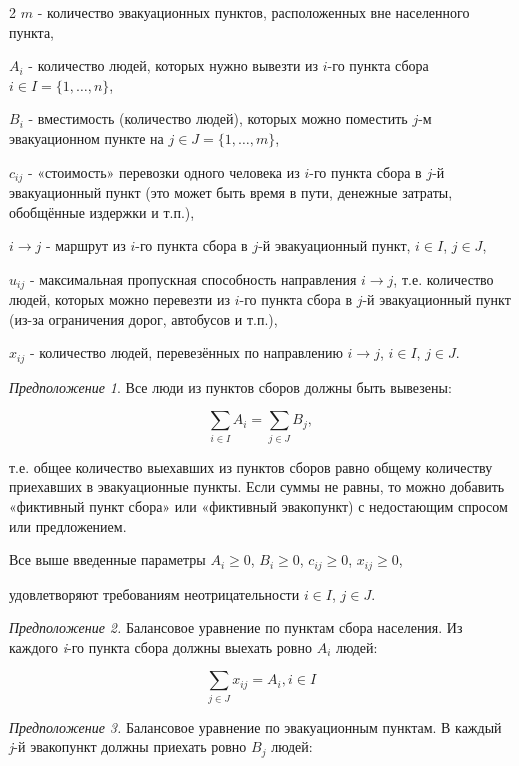 \begin{multicols}{2}
\(m\) - количество эвакуационных пунктов, расположенных вне
населенного пункта,

\(A_i\) - количество людей, которых нужно вывезти из \(i\)-го пункта сбора
\(i \in I = \{1, \dots, n\}\),

\(B_i\) - вместимость (количество людей), которых можно поместить \(j\)-м
эвакуационном пункте на \(j \in J = \{1, \dots, m\}\),

\(c_{ij}\) - «стоимость» перевозки одного человека из \(i\)-го пункта сбора в
\(j\)-й эвакуационный пункт (это может быть время в пути, денежные
затраты, обобщённые издержки и т.п.),

\(i \rightarrow j\) - маршрут из \(i\)-го пункта сбора в \(j\)-й эвакуационный пункт,
\(i \in I\), \(j \in J\),

\(u_{ij}\) - максимальная пропускная способность направления \(i \rightarrow j\),
т.е. количество людей, которых можно перевезти из \(i\)-го пункта
сбора в \(j\)-й эвакуационный пункт (из-за ограничения дорог,
автобусов и т.п.),

\(x_{ij}\) - количество людей, перевезённых по направлению
\(i \rightarrow j\), \(i \in I\), \(j \in J\).

\emph{Предположение 1}. Все люди из пунктов сборов должны быть вывезены:

\begin{equation}
\sum_{i \in I} A_{i} = \sum_{j \in J} B_{j},
\end{equation}

т.е. общее количество выехавших из пунктов сборов равно общему
количеству приехавших в эвакуационные пункты. Если суммы не равны, то
можно добавить «фиктивный пункт сбора» или «фиктивный эвакопункт) с
недостающим спросом или предложением.

Все выше введенные параметры
\(A_i\geq0\),
\(B_i\geq0\),
\(c_{ij}\geq0\),
\(x_{ij}\geq0\),

удовлетворяют требованиям неотрицательности \(i \in I\), \(j \in J\).

\emph{Предположение 2.} Балансовое уравнение по пунктам сбора населения.
Из каждого \emph{i}-го пункта сбора должны выехать ровно \(A_i\) людей:

\begin{equation}
\sum_{j \in J} x_{ij} = A_{i}, i \in I
\end{equation}

\emph{Предположение 3.} Балансовое уравнение по эвакуационным пунктам. В
каждый \emph{j}-й эвакопункт должны приехать ровно \(B_j\) людей:


\end{multicols}
